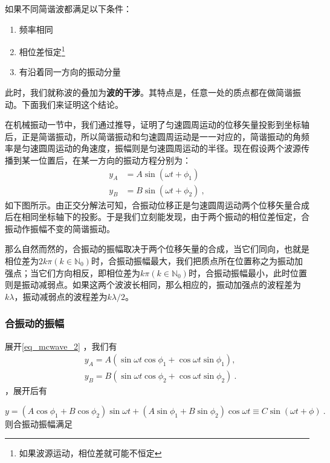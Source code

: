 如果不同简谐波都满足以下条件：
\begin{enumerate}
\item 频率相同
\item 相位差恒定\footnote{如果波源运动，相位差就可能不恒定}
\item 有沿着同一方向的振动分量
\end{enumerate}
此时，我们就称波的叠加为\textbf{波的干涉}。其特点是，任意一处的质点都在做简谐振动。下面我们来证明这个结论。



在机械振动一节中，我们通过推导，证明了匀速圆周运动的位移矢量投影到坐标轴后，正是简谐振动，所以简谐振动和匀速圆周运动是一一对应的，简谐振动的角频率是匀速圆周运动的角速度，振幅则是匀速圆周运动的半径。现在假设两个波源传播到某一位置后，在某一方向的振动方程分别为：
\begin{equation}\label{eq_mcwave_2}
\begin{aligned}
y_A&=A\sin(\omega t+\phi_1)\\
y_B&=B\sin (\omega t+\phi_2)~,
\end{aligned}
\end{equation}
如下图所示。由正交分解法可知，合振动位移正是匀速圆周运动两个位移矢量合成后在相同坐标轴下的投影。于是我们立刻能发现，由于两个振动的相位差恒定，合振动作振幅不变的简谐振动。

那么自然而然的，合振动的振幅取决于两个位移矢量的合成，当它们同向，也就是相位差为$2k\pi(k\in \mathbb{N}_0)$时，合振动振幅最大，我们把质点所在位置称之为振动加强点；当它们方向相反，即相位差为$k\pi(k\in \mathbb{N}_0)$时，合振动振幅最小，此时位置则是振动减弱点。如果这两个波波长相同，那么相应的，振动加强点的波程差为$k\lambda $，振动减弱点的波程差为$k\lambda/2$。
\subsubsection{合振动的振幅}
展开\autoref{eq_mcwave_2} ，我们有
\begin{equation}
\begin{aligned}
& y_A=A\left(\sin \omega t \cos \phi_1+\cos \omega t \sin \phi_1\right), \\
& y_B=B\left(\sin \omega t \cos \phi_2+\cos \omega t \sin \phi_2\right)~.
\end{aligned}
\end{equation}
，展开后有

\begin{equation}
y=\left(A \cos \phi_1+B \cos \phi_2\right) \sin \omega t+\left(A \sin \phi_1+B \sin \phi_2\right) \cos \omega t\equiv C\sin (\omega t+\phi)~.
\end{equation}
则合振动振幅满足

